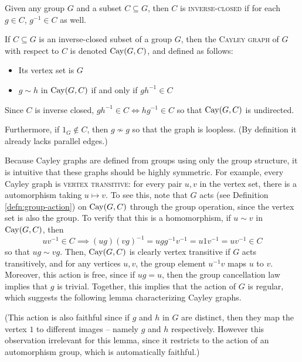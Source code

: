 \documentclass{report}
\begin{document}
    \begin{defn}\label{defn:cayley-graph}
      Given any group $G$ and a subset $C \subseteq G$,
      then $C$ is \textsc{inverse-closed} if for each $g \in C$,
      $g^{-1} \in C$ as well.

      If $C \subseteq G$ is an inverse-closed subset of a group $G$,
      then the \textsc{Cayley graph} of $G$ with respect to $C$ is denoted
      $\operatorname{Cay}(G, C)$, and defined as follows:
      \begin{itemize}
        \item Its vertex set is $G$
        \item $g \sim h$ in $\operatorname{Cay}(G, C)$ if and only if $gh^{-1} \in C$
      \end{itemize}

      Since $C$ is inverse closed, $gh^{-1} \in C \iff hg^{-1} \in C$
      so that $\operatorname{Cay}(G, C)$ is undirected.

      Furthermore, if $1_G \not\in C$, then $g \not\sim g$ so that the graph is
      loopless.  (By definition it already lacks parallel edges.)
    \end{defn}

    Because Cayley graphs are defined from groups using only the group
    structure, it is intuitive that these graphs should be highly symmetric.
    For example, every Cayley graph is \textsc{vertex transitive}: for every
    pair $u, v$ in the vertex set, there is a automorphism taking $u \mapsto v$.
    To see this, note that $G$ acts (see Definition \ref{defn:group-action}) on $\operatorname{Cay}(G, C)$ through
    the group operation, since the vertex set is also the group.
    To verify that this is a homomorphism, if $u \sim v$ in $\operatorname{Cay}(G, C)$, then
    $$
      uv^{-1} \in C
      \implies (ug)(vg)^{-1} = ugg^{-1}v^{-1} = u 1 v^{-1} = u v^{-1} \in C
    $$
    so that $ug \sim vg$.
    Then, $\operatorname{Cay}(G, C)$ is clearly vertex transitive if $G$ acts transitively,
    and for any vertices $u, v$, the group element $u^{-1} v$ maps $u$ to $v$.
    Moreover, this action is free, since if $ug = u$, then the group
    cancellation law implies that $g$ is trivial.
    Together, this implies that the action of $G$ is regular,
    which suggests the following lemma characterizing Cayley graphs.

    (This action is also faithful since if $g$ and $h$ in $G$ are distinct, then
    they map the vertex $1$ to different images -- namely $g$ and $h$
    respectively.  However this observation irrelevant for this lemma, since it
    restricts to the action of an automorphism group, which is automatically
    faithful.)
\end{document}
